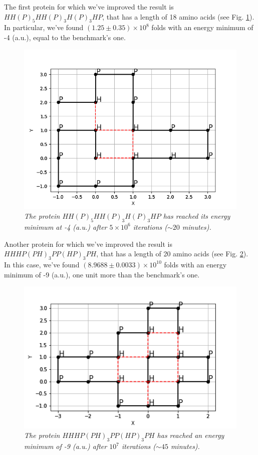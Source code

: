 The first protein for which we've improved the result is $HH(P)_5HH(P)_3H(P)_3HP$, that has a length of 18 amino acids (see Fig. \ref{fig:18_1}).
In particular, we've found $(1.25 \pm 0.35) \times 10^8$ folds with an energy minimum of -4 (a.u.), equal to the benchmark's one.
\begin{figure}[H]
    \centering
    \includegraphics[width=.75\textwidth]{./img/18_1.png}
    \caption{\emph{The protein $HH(P)_5HH(P)_3H(P)_3HP$ has reached its energy minimum at -4 (a.u.) after $5 \times 10^6$ iterations ($\sim 20$ minutes).}}
    \label{fig:18_1}
\end{figure}
Another protein for which we've improved the result is $HHHP(PH)_3PP(HP)_3PH$, that has a length of 20 amino acids (see Fig. \ref{fig:20_2}).
In this case, we've found $(8.9688 \pm 0.0033) \times 10^{10}$ folds with an energy minimum of -9 (a.u.), one unit more than the benchmark's one.
\begin{figure}[H]
    \centering
    \includegraphics[width=.75\textwidth]{./img/20_2.png}
    \caption{\emph{The protein $HHHP(PH)_3PP(HP)_3PH$ has reached an energy minimum of -9 (a.u.) after $10^7$ iterations ($\sim 45$ minutes).}}
    \label{fig:20_2}
\end{figure}
